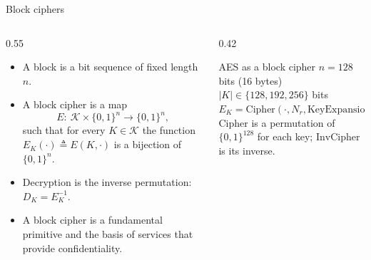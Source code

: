 \documentclass[aspectratio=169,10pt]{beamer}
\newcommand{\fn}[1]{\mathrm{#1}}
\newcommand{\Nr}{N_{r}}
\begin{document}
\begin{frame}{Block ciphers}
\begin{columns}[T]
\begin{column}{0.55\textwidth}
\begin{itemize}
\item A \alert{block} is a bit sequence of fixed length $n$.
\item A \alert{block cipher} is a map
  \[ E:\ \mathcal{K}\times\{0,1\}^{n}\to\{0,1\}^{n}, \]
  such that for every $K\in\mathcal{K}$ the function $E_K(\cdot)\triangleq E(K,\cdot)$
  is a \alert{bijection} of $\{0,1\}^{n}$.
\item Decryption is the inverse permutation: $D_K=E_K^{-1}$.
\item A block cipher is a fundamental primitive and the basis of services
  that provide \alert{confidentiality}.
\end{itemize}
\end{column}
\begin{column}{0.42\textwidth}
\begin{tbox}{AES as a block cipher}
\small
$n=128$ bits (16 bytes)\\[2pt]
$|K|\in\{128,192,256\}$ bits\\[2pt]
$E_K=\fn{Cipher}(\cdot,\Nr,\fn{KeyExpansion}(K))$\\[4pt]
$\fn{Cipher}$ is a permutation of $\{0,1\}^{128}$ for each key;
$\fn{InvCipher}$ is its inverse.
\end{tbox}
\end{column}
\end{columns}
\end{frame}
\end{document}
